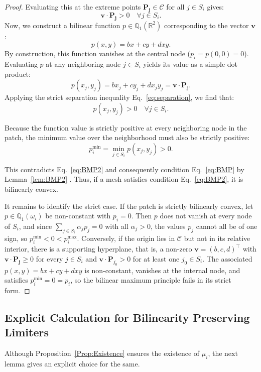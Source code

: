 \documentclass[a4paper]{article}
\theoremstyle{plain}
\theoremstyle{definition}
\theoremstyle{remark}
\begin{document}
\begin{proof}
Evaluating this at the extreme points $\mathbf{P_j} \in \mathcal{C}$ for all $j \in S_i$ gives:
\begin{equation}
\mathbf{v} \cdot \mathbf{P_j} > 0 \quad \forall j \in S_i. \label{eq:separation}
\end{equation}
Now, we construct a bilinear function $p \in \mathbb{Q}_1(\mathbb{R}^2)$ corresponding to the vector $\mathbf{v}$ :
$$
p(x,y) = bx + cy + dxy.
$$
By construction, this function vanishes at the central node ($p_i = p(0,0) = 0$). Evaluating $p$ at any neighboring node $j \in S_i$ yields its value as a simple dot product:
$$
p(x_j, y_j) = bx_j + cy_j + dx_j y_j = \mathbf{v} \cdot \mathbf{P_j}.
$$
Applying the strict separation inequality Eq.~\eqref{eq:separation}, we find that:
$$
p(x_j, y_j) > 0 \quad \forall j \in S_i.
$$

Because the function value is strictly positive at every neighboring node in the patch, the minimum value over the neighborhood must also be strictly positive:
$$
p_i^{\min} = \min_{j \in S_i} p(x_j, y_j) > 0.
$$

This contradicts Eq.~\eqref{eq:BMP2} and consequently condition Eq.~\eqref{eq:BMP} by Lemma~\ref{lem:BMP2} . Thus, if a mesh satisfies condition Eq.~\eqref{eq:BMP2}, it is bilinearly convex.

It remains to identify the strict case. If the patch is strictly bilinearly convex, let $p \in \mathbb{Q}_1(\omega_i)$ be non-constant with $p_i = 0$. Then $p$ does not vanish at every node of $S_i$, and since $\sum_{j \in S_i} \alpha_j p_j = 0$ with all $\alpha_j > 0$, the values $p_j$ cannot all be of one sign, so $p_i^{\min} < 0 < p_i^{\max}$. Conversely, if the origin lies in $\mathcal{C}$ but not in its relative interior, there is a supporting hyperplane, that is, a non-zero $\mathbf{v} = (b,c,d)^\top$ with $\mathbf{v} \cdot \mathbf{P_j} \geq 0$ for every $j \in S_i$ and $\mathbf{v} \cdot \mathbf{P}_{j_0} > 0$ for at least one $j_0 \in S_i$. The associated $p(x,y) = bx + cy + dxy$ is non-constant, vanishes at the internal node, and satisfies $p_i^{\min} = 0 = p_i$, so the bilinear maximum principle fails in its strict form.
\end{proof}

\subsection{Explicit Calculation for Bilinearity Preserving Limiters}\label{sec:explicitmu}
Although Proposition~\ref{Prop:Existence} ensures the existence of $\mu_i$, the next lemma gives an explicit choice for the same.
\end{document}
